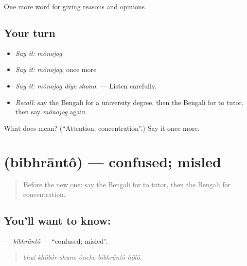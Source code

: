 \begin{grammarlens}[title={What you've built}]
One more word for giving reasons and opinions.
\end{grammarlens}

\subsection*{Your turn}
\begin{itemize}
\raggedright
  \item \emph{Say it:} \emph{mônojog}
  \item \emph{Say it:} \emph{mônojog}, once more
  \item \emph{Say it:} \emph{mônojog diye shono.} — Listen carefully.
  \item \emph{Recall:} say the Bengali for a university degree, then the Bengali for to tutor, then say \emph{mônojog} again
\end{itemize}

\begin{tcolorbox}[breakable,colback=teal!4,colframe=teal!35!black,title={Before you move on}]
What does  mean? (\textquotedblleft{}Attention; concentration\textquotedblright{}.) Say it once more.
\end{tcolorbox}
\section[\texorpdfstring{\bn{বিভ্রান্ত} (bibhrāntô)}{বিভ্রান্ত (bibhrāntô)}]{ (bibhrāntô) — confused; misled}

\label{lesson:BN-C362-bibhranto}



\begin{quote}
Before the new one: say the Bengali for to tutor, then the Bengali for concentration.
\end{quote}

\subsection*{You'll want to know: }
\textbf{} — \emph{bibhrāntô} — \textquotedblleft{}confused; misled\textquotedblright{}.

\begin{quote}
     
\end{quote}

\begin{quote}
\emph{bhul khôbôr shune ôneke bibhrāntô hôlô.}
\end{quote}

